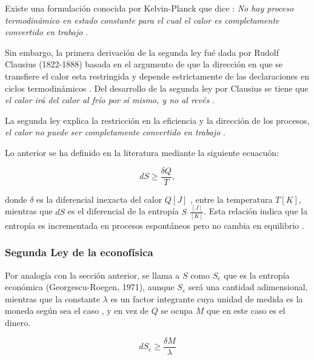 

Existe una formulación conocida por Kelvin-Planck que dice : \textit{No hay proceso termodinámico en estado constante para el cual el calor es completamente convertido en trabajo} \citep[][pagina 86]{struchtrup}.

Sin embargo, la primera derivación de la segunda ley fué dada por Rudolf Clausius (1822-1888) basada en el argumento de que la dirección en que se transfiere el calor esta restringida y depende estrictamente de las declaraciones en ciclos termodinámicos \citep[][pagina 55]{struchtrup}.  Del desarrollo de la segunda ley por Clausius se tiene que \textit{el calor irá del calor al frío por sí mismo, y no al revés} \citep[][pagina 64]{struchtrup}.

La segunda ley explica la restricción en la eficiencia y la dirección de los procesos, \textit{el calor no puede ser completamente convertido en trabajo} \citep[][pagina 5]{struchtrup}. 

Lo anterior se ha definido en la literatura mediante la siguiente ecuacuón:

\begin{equation}
dS \geqslant \frac{\delta Q}{T},
\end{equation}

donde $\delta$ es la diferencial inexacta del calor $Q [J]$ , entre la temperatura $T [K]$, mientras que $dS$ es el diferencial de la entropía $S$ $\frac{[J]}{[K]}$. Esta relación indica que la entropía es incrementada en procesos espontáneos pero no cambia en equilibrio \citep[][pagina 340]{keszei2011chemical}. 

\subsubsection{Segunda Ley de la econofísica} 

Por analogía con la sección anterior, se llama a $S$ como $S_e$ que es la entropía económica (Georgescu-Roegen, 1971), aunque $S_e$ será una cantidad adimensional, mientras que la constante $\lambda$ es un factor integrante cuya unidad de medida es la moneda según sea el caso \citep[][pagina 166]{richmond} , y en vez de $Q$ se ocupa $M$ que en este caso es el dinero. 

\begin{equation}
dS_e \geqslant \frac{\delta M}{\lambda}
\end{equation}

